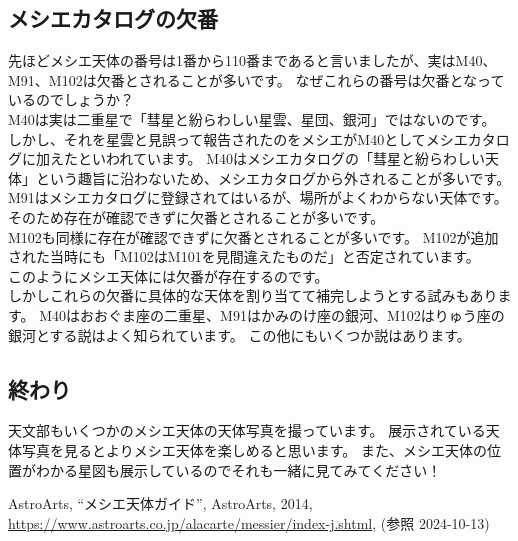 \documentclass[../main]{subfiles}
\begin{document}
\subsection*{メシエカタログの欠番}
先ほどメシエ天体の番号は1番から110番まであると言いましたが、実はM40、M91、M102は欠番とされることが多いです。
なぜこれらの番号は欠番となっているのでしょうか？\\
M40は実は二重星で「彗星と紛らわしい星雲、星団、銀河」ではないのです。
しかし、それを星雲と見誤って報告されたのをメシエがM40としてメシエカタログに加えたといわれています。
M40はメシエカタログの「彗星と紛らわしい天体」という趣旨に沿わないため、メシエカタログから外されることが多いです。
\\
M91はメシエカタログに登録されてはいるが、場所がよくわからない天体です。
そのため存在が確認できずに欠番とされることが多いです。
\\
M102も同様に存在が確認できずに欠番とされることが多いです。
M102が追加された当時にも「M102はM101を見間違えたものだ」と否定されています。
\\
このようにメシエ天体には欠番が存在するのです。
\\
しかしこれらの欠番に具体的な天体を割り当てて補完しようとする試みもあります。
M40はおおぐま座の二重星、M91はかみのけ座の銀河、M102はりゅう座の銀河とする説はよく知られています。
この他にもいくつか説はあります。

\subsection*{終わり}
天文部もいくつかのメシエ天体の天体写真を撮っています。
展示されている天体写真を見るとよりメシエ天体を楽しめると思います。
また、メシエ天体の位置がわかる星図も展示しているのでそれも一緒に見てみてください！


\begin{thebibliography}{9}
   AstroArts, ``メシエ天体ガイド'', AstroArts, 2014, \url{https://www.astroarts.co.jp/alacarte/messier/index-j.shtml}, (参照 2024-10-13)
\end{thebibliography}
\end{document}
